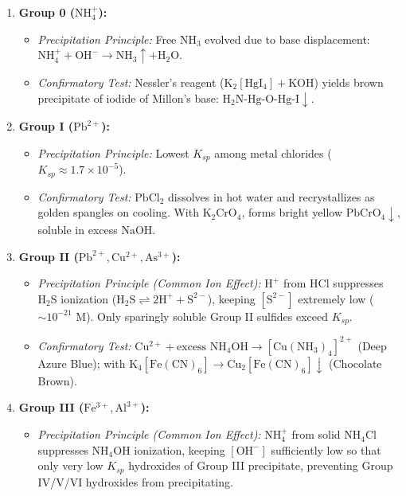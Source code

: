 \documentclass[10pt,twoside,openright]{book}
\begin{document}
\begin{conceptbox}
\begin{enumerate}[leftmargin=*]
  \item \textbf{Group 0 ($\mathrm{NH_4^+}$):}
  \begin{itemize}
    \item \textit{Precipitation Principle:} Free $\mathrm{NH_3}$ evolved due to base displacement: $\mathrm{NH_4^+} + \mathrm{OH^-} \to \mathrm{NH_3}\uparrow + \mathrm{H_2O}$.
    \item \textit{Confirmatory Test:} Nessler's reagent ($\mathrm{K_2[HgI_4]} + \mathrm{KOH}$) yields brown precipitate of iodide of Millon's base: $\mathrm{H_2N\text{-}Hg\text{-}O\text{-}Hg\text{-}I}\downarrow$.
  \end{itemize}
  \item \textbf{Group I ($\mathrm{Pb^{2+}}$):}
  \begin{itemize}
    \item \textit{Precipitation Principle:} Lowest $K_{sp}$ among metal chlorides ($K_{sp} \approx 1.7 \times 10^{-5}$).
    \item \textit{Confirmatory Test:} $\mathrm{PbCl_2}$ dissolves in hot water and recrystallizes as golden spangles on cooling. With $\mathrm{K_2CrO_4}$, forms bright yellow $\mathrm{PbCrO_4}\downarrow$, soluble in excess $\mathrm{NaOH}$.
  \end{itemize}
  \item \textbf{Group II ($\mathrm{Pb^{2+}, Cu^{2+}, As^{3+}}$):}
  \begin{itemize}
    \item \textit{Precipitation Principle (Common Ion Effect):} $\mathrm{H}^+$ from $\mathrm{HCl}$ suppresses $\mathrm{H_2S}$ ionization ($\mathrm{H_2S} \rightleftharpoons 2\mathrm{H}^+ + \mathrm{S}^{2-}$), keeping $[\mathrm{S}^{2-}]$ extremely low ($\sim 10^{-21}\text{ M}$). Only sparingly soluble Group II sulfides exceed $K_{sp}$.
    \item \textit{Confirmatory Test:} $\mathrm{Cu^{2+}} + \text{excess } \mathrm{NH_4OH} \to [\mathrm{Cu(NH_3)_4}]^{2+}$ (Deep Azure Blue); with $\mathrm{K_4[Fe(CN)_6]} \to \mathrm{Cu_2[Fe(CN)_6]}\downarrow$ (Chocolate Brown).
  \end{itemize}
  \item \textbf{Group III ($\mathrm{Fe^{3+}, Al^{3+}}$):}
  \begin{itemize}
    \item \textit{Precipitation Principle (Common Ion Effect):} $\mathrm{NH_4^+}$ from solid $\mathrm{NH_4Cl}$ suppresses $\mathrm{NH_4OH}$ ionization, keeping $[\mathrm{OH}^-]$ sufficiently low so that only very low $K_{sp}$ hydroxides of Group III precipitate, preventing Group IV/V/VI hydroxides from precipitating.

\end{itemize}
\end{enumerate}
\end{conceptbox}
\end{document}
